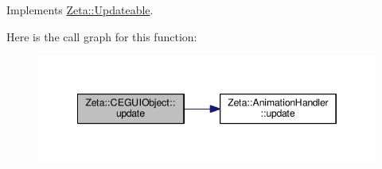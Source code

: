 Implements \hyperlink{classZeta_1_1Updateable_af4006bfccb762454b4da08786ad93de0}{Zeta\+::\+Updateable}.



Here is the call graph for this function\+:\nopagebreak
\begin{figure}[H]
\begin{center}
\leavevmode
\includegraphics[width=346pt]{classZeta_1_1CEGUIObject_a1405067e8f017f628134304da11dc0bf_cgraph}
\end{center}
\end{figure}




